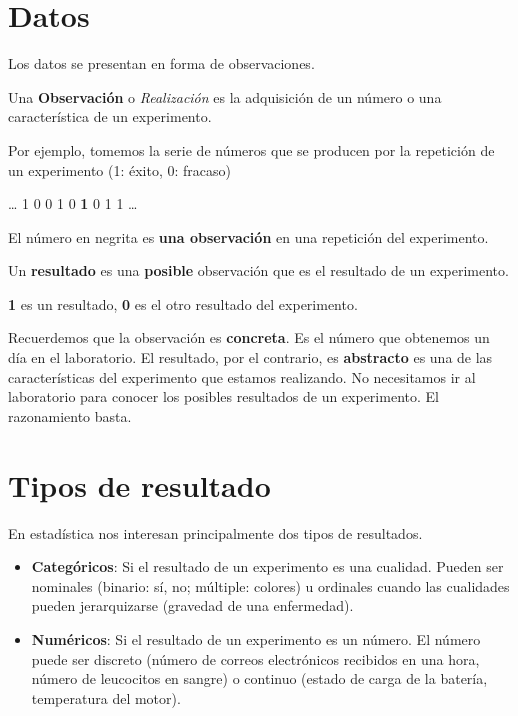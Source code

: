\documentclass[
]{book}
\begin{document}
\hypertarget{datos}{%
\section{Datos}\label{datos}}

Los datos se presentan en forma de observaciones.

Una \textbf{Observación} o \emph{Realización} es la adquisición de un número o una característica de un experimento.

Por ejemplo, tomemos la serie de números que se producen por la repetición de un experimento (1: éxito, 0: fracaso)

\ldots{} 1 0 0 1 0 \textbf{1} 0 1 1 \ldots{}

El número en negrita es \textbf{una observación} en una repetición del experimento.

Un \textbf{resultado} es una \textbf{posible} observación que es el resultado de un experimento.

\textbf{1} es un resultado, \textbf{0} es el otro resultado del experimento.

Recuerdemos que la observación es \textbf{concreta}. Es el número que obtenemos un día en el laboratorio. El resultado, por el contrario, es \textbf{abstracto} es una de las características del experimento que estamos realizando. No necesitamos ir al laboratorio para conocer los posibles resultados de un experimento. El razonamiento basta.

\hypertarget{tipos-de-resultado}{%
\section{Tipos de resultado}\label{tipos-de-resultado}}

En estadística nos interesan principalmente dos tipos de resultados.

\begin{itemize}
\item
  \textbf{Categóricos}: Si el resultado de un experimento es una cualidad. Pueden ser nominales (binario: sí, no; múltiple: colores) u ordinales cuando las cualidades pueden jerarquizarse (gravedad de una enfermedad).
\item
  \textbf{Numéricos}: Si el resultado de un experimento es un número. El número puede ser discreto (número de correos electrónicos recibidos en una hora, número de leucocitos en sangre) o continuo (estado de carga de la batería, temperatura del motor).
\end{itemize}
\end{document}
